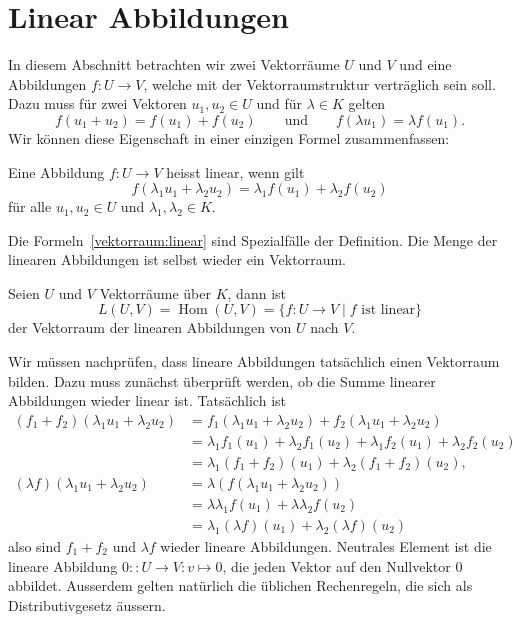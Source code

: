 %
%
%
\section{Linear Abbildungen%
\label{section:vektorraum:linabb}}
In diesem Abschnitt betrachten wir zwei Vektorräume $U$ und $V$ und
eine Abbildungen $f\colon U\to V$, welche mit der Vektorraumstruktur
verträglich sein soll. 
Dazu muss für zwei Vektoren $u_1,u_2\in U$ und für $\lambda\in K$ gelten
\begin{equation}
f(u_1+u_2)=f(u_1)+f(u_2)
\qquad\text{und}\qquad
f(\lambda u_1)=\lambda f(u_1).
\label{vektorraum:linear}
\end{equation}
Wir können diese Eigenschaft in einer einzigen Formel zusammenfassen:

\begin{definition}
Eine Abbildung $f\colon U\to V$ heisst linear, wenn gilt
\[
f(\lambda_1 u_1+\lambda_2 u_2)=\lambda_1 f(u_1) + \lambda_2 f(u_2)
\]
für alle $u_1,u_2\in U$ und $\lambda_1,\lambda_2\in K$.
\end{definition}

Die Formeln~\eqref{vektorraum:linear} sind Spezialfälle der Definition.
Die Menge der linearen Abbildungen ist selbst wieder ein Vektorraum.

\begin{definition}
Seien $U$ und $V$ Vektorräume über $K$, dann ist
\[
L(U,V)
=
\operatorname{Hom}(U,V)
=
\{f\colon U\to V\;|\; \text{$f$ ist linear}\}
\]
der Vektorraum der linearen Abbildungen von $U$ nach $V$.
\end{definition}

Wir müssen nachprüfen, dass lineare Abbildungen tatsächlich einen
Vektorraum bilden. 
Dazu muss zunächst überprüft werden, ob die Summe linearer Abbildungen
wieder linear ist.
Tatsächlich ist
\begin{align*}
(f_1+f_2)(\lambda_1u_1+\lambda_2 u_2)
&=
f_1(\lambda_1u_1+\lambda_2 u_2)
+
f_2(\lambda_1u_1+\lambda_2 u_2)
\\
&=
\lambda_1f_1(u_1)+\lambda_2f_1(u_2)
+
\lambda_1f_2(u_1)+\lambda_2 f_2(u_2)
\\
&=
\lambda_1(f_1 + f_2)(u_1)+\lambda_2(f_1+f_2)(u_2),
\\
(\lambda f)(\lambda_1 u_1 + \lambda_2 u_2)
&=
\lambda (f(\lambda_1 u_1 + \lambda_2 u_2))
\\
&=
\lambda\lambda_1 f(u_1)
+
\lambda\lambda_2 f(u_2)
\\
&=
\lambda_1 (\lambda f)(u_1)
+
\lambda_2 (\lambda f)(u_2)
\end{align*}
also sind $f_1+f_2$ und $\lambda f$ wieder lineare Abbildungen.
Neutrales Element ist die lineare Abbildung $0:\colon U\to V:v\mapsto 0$,
die jeden Vektor auf den Nullvektor $0$ abbildet.
Ausserdem gelten natürlich die üblichen Rechenregeln, die sich als
Distributivgesetz äussern.


